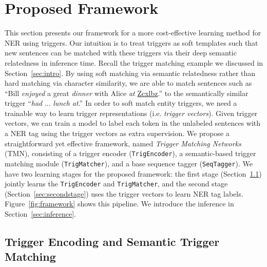 \section{Proposed Framework}
\label{sec:tmn}
This section presents our framework for a more cost-effective learning method for NER using triggers. Our intuition is to treat triggers as soft templates such that new sentences can be matched with these triggers via their deep semantic relatedness in inference time. Recall the trigger matching example we discussed in Section~\ref{sec:intro}. By using soft matching via semantic relatedness rather than hard matching via character similarity, we are able to match sentences such as ``Bill \textit{enjoyed} a great \textit{dinner} with Alice \textit{at} \underline{Zcxlbz}.'' to the semantically similar trigger ``\textit{had} ... \textit{lunch at}.''
In order to soft match entity triggers, we need a trainable way to learn trigger representations (i.e. \textit{trigger vectors}).
Given trigger vectors, we can train a model to label each token in the unlabeled sentences with a NER tag using the trigger vectors as extra supervision.
We propose a straightforward yet effective framework, named \textit{Trigger Matching Networks} (TMN), consisting of a trigger encoder ({\texttt{TrigEncoder}}), a semantic-based trigger matching module (\texttt{TrigMatcher}), and a base {sequence tagger} (\texttt{SeqTagger}). 
We have two learning stages for the proposed framework: the first stage (Section~\ref{sec:firststage}) jointly learns the \texttt{TrigEncoder} and \texttt{TrigMatcher}, and the second stage (Section~\ref{sec:secondstage}) uses the trigger vectors to learn NER tag labels.
Figure~\ref{fig:framework} shows this pipeline. We introduce the inference in Section~\ref{sec:inference}.




\subsection{Trigger Encoding and Semantic Trigger Matching}
\label{sec:firststage}

